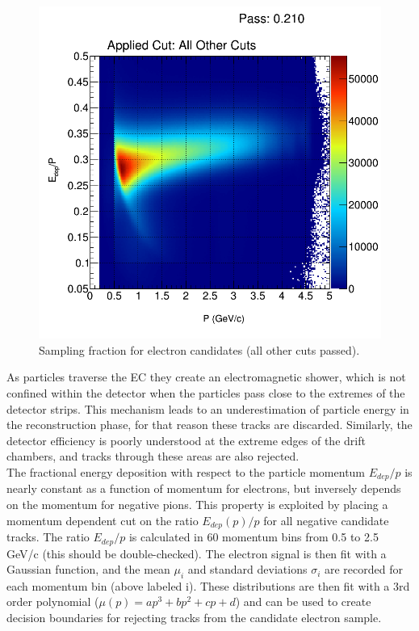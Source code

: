 \begin{figure}
  \label{fig:sampling_fraction}
  \begin{center}
    \includegraphics[width=\columnwidth]{image/h_etot_p_allOthers_all.png}
    \caption{Sampling fraction for electron candidates (all other cuts passed).}
  \end{center}
\end{figure}

As particles traverse the EC they create an electromagnetic shower, which is not confined within the detector when the particles pass close to the extremes of the detector strips.  This mechanism leads to an underestimation of particle energy in the reconstruction phase, for that reason these tracks are discarded.  Similarly, the detector efficiency is poorly understood at the extreme edges of the drift chambers, and tracks through these areas are also rejected.  \\

The fractional energy deposition with respect to the particle momentum $E_{dep}/p$ is nearly constant as a function of momentum for electrons, but inversely depends on the momentum for negative pions.  This property is exploited by placing a momentum dependent cut on the ratio $E_{dep}(p)/p$ for all negative candidate tracks.  The ratio $E_{dep}/p$ is calculated in 60 momentum bins from 0.5 to 2.5 GeV/c (this should be double-checked).  The electron signal is then fit with a Gaussian function, and the mean $\mu_i$ and standard deviations $\sigma_i$ are recorded for each momentum bin (above labeled i).  These distributions are then fit with a 3rd order polynomial ($\mu(p) = ap^3 + bp^2 + cp + d$) and can be used to create decision boundaries for rejecting tracks from the candidate electron sample.  
\\

